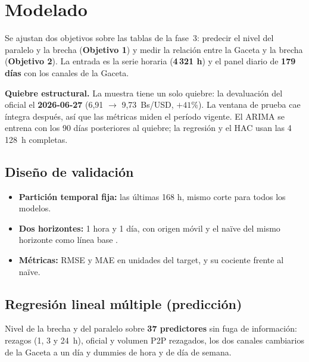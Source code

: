 \section{Modelado}
\label{sec:modelado}

Se ajustan dos objetivos sobre las tablas de la fase~3: predecir el nivel del
paralelo y la brecha (\textbf{Objetivo 1}) y medir la relación entre la Gaceta y
la brecha (\textbf{Objetivo 2}). La entrada es la serie horaria (\textbf{4\,321
h}) y el panel diario de \textbf{179 días} con los canales de la Gaceta.

\textbf{Quiebre estructural.} La muestra tiene un solo quiebre: la devaluación
del oficial el \textbf{2026-06-27} (6{,}91 $\rightarrow$ 9{,}73~Bs/USD, $+41\%$).
La ventana de prueba cae íntegra después, así que las métricas miden el período
vigente. El ARIMA se entrena con los 90 días posteriores al quiebre; la regresión
y el HAC usan las 4\,128~h completas.

\subsection{Diseño de validación}

\begin{itemize}
  \item \textbf{Partición temporal fija:} las últimas 168 h, mismo corte para
        todos los modelos.
  \item \textbf{Dos horizontes:} 1 hora y 1 día, con origen móvil y el naïve
        del mismo horizonte como línea base
        \cite{makridakis2020m4}.
  \item \textbf{Métricas:} RMSE y MAE en unidades del target, y su cociente
        frente al naïve.
\end{itemize}

\subsection{Regresión lineal múltiple (predicción)}

Nivel de la brecha y del paralelo sobre \textbf{37 predictores} sin fuga de
información: rezagos (1, 3 y 24~h), oficial y volumen P2P rezagados, los dos
canales cambiarios de la Gaceta a un día y dummies de hora y de día de semana.

